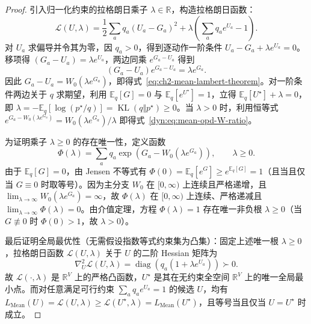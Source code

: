 \documentclass[lang=cn,scheme=chinese,openany]{elegantbook}
\newcommand{\E}{\mathbb E}
\newcommand{\KL}{\operatorname{KL}}
\newcommand{\R}{\mathbb R}
\begin{document}
\begin{proof}
引入归一化约束的拉格朗日乘子 $\lambda\in\R$，构造拉格朗日函数：
\begin{equation*}
\mathscr L(U,\lambda)
=\frac12\sum_a q_a(U_a-G_a)^2
+\lambda\left(\sum_a q_a e^{U_a}-1\right).
\end{equation*}
对 $U_a$ 求偏导并令其为零，因 $q_a>0$，得到逐动作一阶条件 $U_a-G_a+\lambda e^{U_a}=0$。移项得 $(G_a-U_a)=\lambda e^{U_a}$，两边同乘 $e^{G_a-U_a}$ 得到
\begin{equation*}
(G_a-U_a)e^{G_a-U_a}=\lambda e^{G_a}.
\end{equation*}
因此 $G_a-U_a=W_0(\lambda e^{G_a})$，即得式~\eqref{eq:ch2-mean-lambert-theorem}。对一阶条件两边关于 $q$ 求期望，利用 $\E_q[G]=0$ 与 $\E_q[e^{U^\star}]=1$，立得 $\E_q[U^\star]+\lambda=0$，即 $\lambda=-\E_q[\log(p^\star/q)]=\KL(q\Vert p^\star)\ge 0$。当 $\lambda>0$ 时，利用恒等式 $e^{G_a-W_0(\lambda e^{G_a})}=W_0(\lambda e^{G_a})/\lambda$ 即得式~\eqref{dyn:eq:mean-opd-W-ratio}。

为证明乘子 $\lambda\ge 0$ 的存在唯一性，定义函数
\begin{equation*}
\Phi(\lambda)=\sum_a q_a\exp\!\left(G_a-W_0(\lambda e^{G_a})\right),\qquad \lambda\ge 0.
\end{equation*}
由于 $\E_q[G]=0$，由 Jensen 不等式有 $\Phi(0)=\E_q[e^G]\ge e^{\E_q[G]}=1$（且当且仅当 $G\equiv 0$ 时取等号）。因为主分支 $W_0$ 在 $[0,\infty)$ 上连续且严格递增，且 $\lim_{\lambda\to\infty}W_0(\lambda e^{G_a})=\infty$，故 $\Phi(\lambda)$ 在 $[0,\infty)$ 上连续、严格递减且 $\lim_{\lambda\to\infty}\Phi(\lambda)=0$。由介值定理，方程 $\Phi(\lambda)=1$ 存在唯一非负根 $\lambda\ge 0$（当 $G\not\equiv 0$ 时 $\Phi(0)>1$，故 $\lambda>0$）。

最后证明全局最优性（无需假设指数等式约束集为凸集）：固定上述唯一根 $\lambda\ge 0$，拉格朗日函数 $\mathscr L(U,\lambda)$ 关于 $U$ 的二阶 Hessian 矩阵为
\begin{equation*}
\nabla_U^2\mathscr L(U,\lambda)
=\operatorname{diag}\!\left( q_a(1+\lambda e^{U_a})\right)\succ0.
\end{equation*}
故 $\mathscr L(\cdot,\lambda)$ 是 $\R^V$ 上的严格凸函数，$U^\star$ 是其在无约束全空间 $\R^V$ 上的唯一全局最小点。而对任意满足可行约束 $\sum_a q_a e^{U_a}=1$ 的候选 $U$，均有 $L_{\mathrm{Mean}}(U)=\mathscr L(U,\lambda)\ge \mathscr L(U^\star,\lambda)=L_{\mathrm{Mean}}(U^\star)$，且等号当且仅当 $U=U^\star$ 时成立。
\end{proof}
\end{document}
